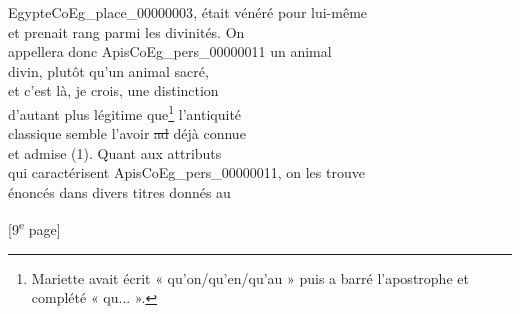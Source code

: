 \documentclass{book}
\begin{document}
{\begin{paracol}{2}
Egypte\gls{CoEg_place_00000003}, était vénéré pour lui-même\\
et prenait rang parmi les divinités. On\\
appellera donc Apis\gls{CoEg_pers_00000011} un animal\\
divin, plutôt qu’un animal sacré,\\
et c’est là, je crois, une distinction\\
d’autant plus légitime que\footnote{Mariette avait écrit « qu’on/qu’en/qu’au » puis a barré l’apostrophe et complété « qu... ».} l’antiquité\\
classique semble l’avoir \sout{ad} déjà connue\\
\noindent et admise (1). Quant aux attributs\\
qui caractérisent Apis\gls{CoEg_pers_00000011}, on les trouve\\
énoncés dans divers titres donnés au
\end{paracol}
{\footnotesize\begin{center} {[9\textsuperscript{e} page]}\end{center}}

}
\end{document}
